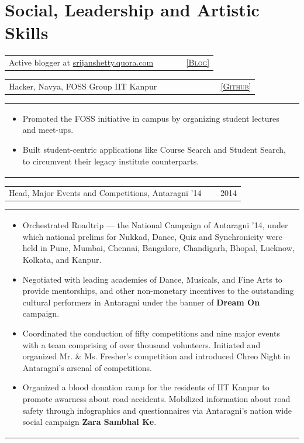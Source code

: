 \documentclass[a4paper]{article} %
\newcommand{\iproject}[3]{
    \begin{tabular}{p{0.85\linewidth}r}
        \textcolor{NavyBlue}{\small #2} & \multicolumn{1}{m{3cm}}{\raggedleft \small {\textsc{#1}}}\\
    \end{tabular}
    \begin{tabular}{p{\linewidth}}
    \vspace{-0.3cm}
        \footnotesize{#3}
    \end{tabular}
    \vspace{-0.6cm}
}
\newcommand{\skill}[2]{
    \begin{tabular}{p{0.85\linewidth}r}
        \small {#2} & \multicolumn{1}{m{3cm}}{\raggedleft \textsc{\small #1}}\\
    \end{tabular}
    \vspace{-0.5cm}
}
\begin{document}
\section {Social, Leadership and Artistic Skills}

\skill {\href{srijanshetty.quora.com} {[Blog]}}
       {Active blogger at \href{srijanshetty.quora.com} {srijanshetty.quora.com}}

\iproject {\href{https://github.com/navya} {[Github]} }
          {Hacker, Navya, FOSS Group IIT Kanpur}
          {
               \begin{itemize}[leftmargin=0.5cm]
                   \item Promoted the FOSS initiative in campus by organizing student lectures and meet-ups.
                   \item Built student-centric applications like Course Search and Student Search, to circumvent
                       their legacy institute counterparts.
               \end{itemize}
          }

\iproject {2014}
          {Head, Major Events and Competitions, Antaragni '14}
          {
               \begin{itemize}[leftmargin=0.5cm]
                    \item Orchestrated Roadtrip --- the National Campaign of Antaragni '14, under which national
                        prelims for Nukkad, Dance, Quiz and Synchronicity were held in Pune, Mumbai, Chennai,
                        Bangalore, Chandigarh, Bhopal, Lucknow, Kolkata, and Kanpur.
                    \item Negotiated with leading academies of Dance, Musicals, and Fine Arts to provide mentorships,
                        and other non-monetary incentives to the outstanding cultural performers in Antaragni
                        under the banner of \textbf{Dream On} campaign.
                    \item Coordinated the conduction of fifty competitions and nine major events with a team
                        comprising of over thousand volunteers.  Initiated and organized Mr. \& Ms. Fresher's
                        competition and introduced Chreo Night in Antaragni's arsenal of competitions.
                   \item Organized a blood donation camp for the residents of IIT Kanpur to promote awarness
                       about road accidents.  Mobilized information about road safety through infographics and questionnaires
                       via Antaragni's nation wide social campaign \textbf{Zara Sambhal Ke}.
               \end{itemize}
          }
\end{document}
